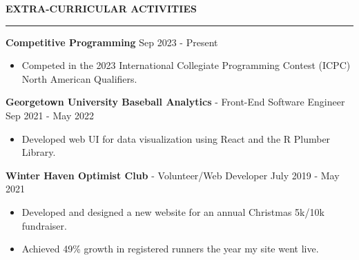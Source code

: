 \documentclass[11pt,letterpaper]{article}
\begin{document}
\medskip
\MakeUppercase{{\bf Extra-Curricular Activities}}
\medskip
\hrule
\begin{list}{}{\setlength{\leftmargin}{0em}}

    \item
    \textbf{Competitive Programming} \hfill Sep 2023 - Present
    \begin{itemize}[topsep=-5pt, noitemsep]
        \item Competed in the 2023 International Collegiate Programming Contest (ICPC) North American Qualifiers.
    \end{itemize}
    \item
          \textbf{Georgetown University Baseball Analytics} - Front-End Software Engineer \hfill Sep 2021 - May 2022
          \begin{itemize}[topsep=-5pt, noitemsep]
              \item Developed web UI for data visualization using React and the R Plumber Library.
          \end{itemize}
    \item
          \textbf{Winter Haven Optimist Club} - Volunteer/Web Developer \hfill July 2019 - May 2021
          \begin{itemize}[topsep=-5pt, noitemsep]
              \item Developed and designed a new website for an annual Christmas 5k/10k fundraiser.
              \item Achieved 49\% growth in registered runners the year my site went live.
          \end{itemize}
\end{list}
\end{document}
